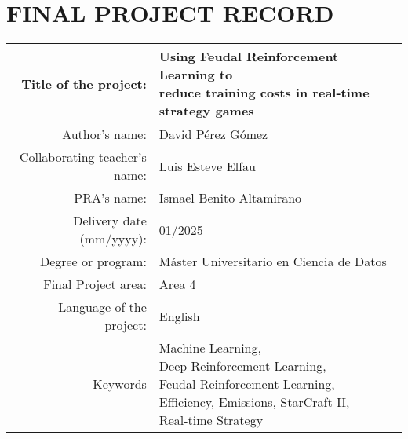 \chapter*{FINAL PROJECT RECORD}

\begin{table}[ht]
\centering{}
\renewcommand{\arraystretch}{2}
\begin{tabular}{r | l}
\hline
Title of the project: & \makecell[cl]{Using Feudal Reinforcement Learning to\\reduce training costs in real-time strategy games}\\
\hline
Author's name: & David Pérez Gómez\\
\hline
Collaborating teacher's name: & Luis Esteve Elfau\\
\hline
PRA's name: & Ismael Benito Altamirano\\
\hline
Delivery date (mm/yyyy): & 01/2025\\
\hline
Degree or program: & Máster Universitario en Ciencia de Datos\\
\hline
Final Project area: & Area 4\\
\hline
Language of the project: & English\\
\hline
Keywords & \makecell[cl]{Machine Learning,\\ Deep Reinforcement Learning,\\ Feudal Reinforcement Learning,\\ Efficiency, Emissions, StarCraft II,\\ Real-time Strategy}\\
\hline
\end{tabular}
\end{table}